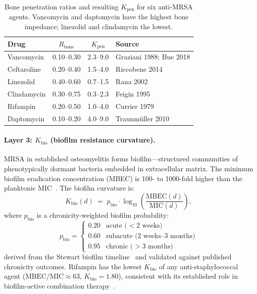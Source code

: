 \documentclass[11pt]{article}
\theoremstyle{plain}
\theoremstyle{definition}
\begin{document}
\begin{table}[t]
\centering
\small
\begin{tabular}{lccl}
\toprule
\textbf{Drug} & $R_{\mathrm{bone}}$ & $K_{\mathrm{pen}}$ &
  \textbf{Source} \\
\midrule
Vancomycin  & 0.10--0.30 & 2.3--9.0 & Graziani 1988; Bue 2018 \\
Ceftaroline & 0.20--0.40 & 1.5--4.0 & Riccobene 2014 \\
Linezolid   & 0.40--0.60 & 0.7--1.5 & Rana 2002 \\
Clindamycin & 0.30--0.75 & 0.3--2.3 & Feigin 1995 \\
Rifampin    & 0.20--0.50 & 1.0--4.0 & Currier 1979 \\
Daptomycin  & 0.10--0.20 & 4.0--9.0 & Traunm\"uller 2010 \\
\bottomrule
\end{tabular}
\caption{Bone penetration ratios and resulting $K_{\mathrm{pen}}$
for six anti-MRSA agents. Vancomycin and daptomycin have the
highest bone impedance; linezolid and clindamycin the lowest.}
\label{tab:bone-pen}
\end{table}

\paragraph{Layer 3: $K_{\mathrm{bio}}$ (biofilm resistance curvature).}
MRSA in established osteomyelitis forms biofilm---structured
communities of phenotypically dormant bacteria embedded in
extracellular matrix. The minimum biofilm eradication concentration
(MBEC) is 100- to 1000-fold higher than the planktonic
MIC~\cite{Stewart2015}. The biofilm curvature is:
\begin{equation}
  \label{eq:k-biofilm}
  K_{\mathrm{bio}}(d) \;=\; p_{\mathrm{bio}} \cdot
  \log_{10}\!\left(\frac{\mathrm{MBEC}(d)}{\mathrm{MIC}(d)}\right),
\end{equation}
where $p_{\mathrm{bio}}$ is a chronicity-weighted biofilm
probability:
\[
  p_{\mathrm{bio}} =
  \begin{cases}
    0.20 & \text{acute ($< 2$ weeks)} \\
    0.60 & \text{subacute (2 weeks--3 months)} \\
    0.95 & \text{chronic ($> 3$ months)}
  \end{cases}
\]
derived from the Stewart biofilm
timeline~\cite{Stewart2015} and validated against published
chronicity outcomes. Rifampin has the lowest $K_{\mathrm{bio}}$ of
any anti-staphylococcal agent ($\mathrm{MBEC/MIC} \approx 63$,
$K_{\mathrm{bio}} = 1.80$), consistent with its established role in
biofilm-active combination therapy~\cite{Zimmerli1998}.
\end{document}
